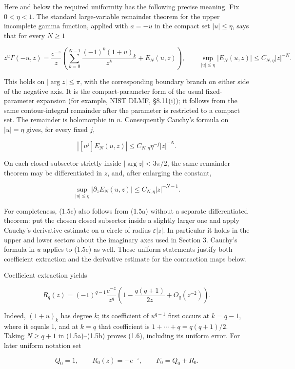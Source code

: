 \documentclass[11pt]{article}
\theoremstyle{keio}
\theoremstyle{definition}
\theoremstyle{remark}
\begin{document}
Here and below the required uniformity has the following precise meaning.
Fix \(0<\eta<1\). The standard large-variable remainder theorem for the
upper incomplete gamma function, applied with \(a=-u\) in the compact set
\(|u|\leq\eta\), says that for every \(N\geq1\)

\[
 z^u\Gamma(-u,z)=\frac{e^{-z}}z
 \left(\sum_{k=0}^{N-1}\frac{(-1)^k(1+u)_k}{z^k}
       +E_N(u,z)\right),
 \qquad
 \sup_{|u|\leq\eta}|E_N(u,z)|\leq C_{N,\eta}|z|^{-N}.
\tag{Inv-1.5a}
\]

This holds on \(|\arg z|\leq\pi\), with the corresponding boundary branch
on either side of the negative axis. It is the compact-parameter form of
the usual fixed-parameter expansion (for example, NIST DLMF, \S8.11(i)); it
follows from the same contour-integral remainder after the parameter is
restricted to a compact set. The remainder is holomorphic in \(u\).
Consequently Cauchy's formula on \(|u|=\eta\) gives, for every fixed \(j\),

\[
 |[u^j]E_N(u,z)|\leq C_{N,\eta}\eta^{-j}|z|^{-N}.
\tag{Inv-1.5b}
\]

On each closed subsector strictly inside \(|\arg z|<3\pi/2\), the same
remainder theorem may be differentiated in \(z\), and, after enlarging the
constant,

\[
 \sup_{|u|\leq\eta}|\partial_zE_N(u,z)|
 \leq C_{N,\eta}|z|^{-N-1}.
\tag{Inv-1.5c}
\]

For completeness, (1.5c) also follows from (1.5a) without a separate
differentiated theorem: put the chosen closed subsector inside a slightly
larger one and apply Cauchy's derivative estimate on a circle of radius
\(\varepsilon|z|\). In particular it holds in the upper and lower sectors
about the imaginary axes used in Section 3. Cauchy's formula in \(u\)
applies to (1.5c) as well. These uniform statements justify both
coefficient extraction and the derivative estimate for the contraction maps
below.

Coefficient extraction yields

\[
 R_q(z)=(-1)^{q-1}\frac{e^{-z}}{z^q}
 \left(1-\frac{q(q+1)}{2z}+O_q(z^{-2})\right).
\tag{Inv-1.6}
\]

Indeed, \((1+u)_k\) has degree \(k\); its coefficient of \(u^{q-1}\) first
occurs at \(k=q-1\), where it equals \(1\), and at \(k=q\) that coefficient
is \(1+\cdots+q=q(q+1)/2\). Taking \(N\geq q+1\) in (1.5a)--(1.5b) proves
(1.6), including its uniform error. For later uniform notation set

\[
 Q_0=1,\qquad R_0(z)=-e^{-z},\qquad F_0=Q_0+R_0.
\tag{Inv-1.7}
\]
\end{document}
